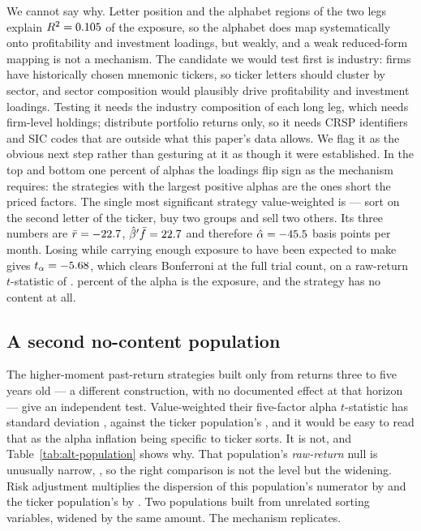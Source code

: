 \documentclass{article}
\begin{document}
We cannot say why. Letter position and the alphabet regions of the two legs
explain $R^2 = 0.105$ of the exposure, so the alphabet does map
systematically onto profitability and investment loadings, but weakly, and a
weak reduced-form mapping is not a mechanism. The candidate we would test first
is industry: firms have historically chosen mnemonic tickers, so ticker letters
should cluster by sector, and sector composition would plausibly drive
profitability and investment loadings. Testing it needs the industry
composition of each long leg, which needs firm-level holdings; \citet{chen2025htap}
distribute portfolio returns only, so it needs CRSP identifiers and SIC codes
that are outside what this paper's data allows. We flag it as the obvious next
step rather than gesturing at it as though it were established. In the top and bottom one
percent of alphas the loadings flip sign as the mechanism requires: the
strategies with the largest positive alphas are the ones short the priced
factors. The single most significant strategy value-weighted is \bzooamWinnerName{} ---
sort on the second letter of the ticker, buy two groups and sell two others.
Its three numbers are $\bar r = -22.7$,
$\hat\beta'\bar f = 22.7$ and therefore
$\hat\alpha = -45.5$ basis points per month. Losing
\bzooamWinnerRbarBps{} while carrying enough exposure to have been expected to
make \bzooamWinnerExposureBps{} gives $t_\alpha = -5.68$, which
clears Bonferroni at the full trial count, on a raw-return $t$-statistic of
\bzooamWinnerMeanT{}. \bzooamWinnerExposureSharePct{} percent of the alpha is
the exposure, and the strategy has no content at all.

\subsection{A second no-content population}



The \bzooamAltN{} higher-moment past-return strategies built only from returns
three to five years old --- a different construction, with no documented effect
at that horizon --- give an independent test.  Value-weighted their five-factor
alpha $t$-statistic has standard deviation \bzooamAltSdAlphaTVw{}, against the
ticker population's \bzoonullFfSdVw{}, and it would be easy to read that as the
alpha inflation being specific to ticker sorts. It is not, and
Table~\ref{tab:alt-population} shows why. That population's \emph{raw-return}
null is unusually narrow, \bzooamAltSdMeanTVw{}, so the right comparison is not
the level but the widening. Risk adjustment multiplies the dispersion of this
population's numerator by \bzooamAltWideningVw{} and the ticker population's by
\bzooamTickerWideningVw{}. Two populations built from unrelated sorting
variables, widened by the same amount. The mechanism replicates.
\end{document}
